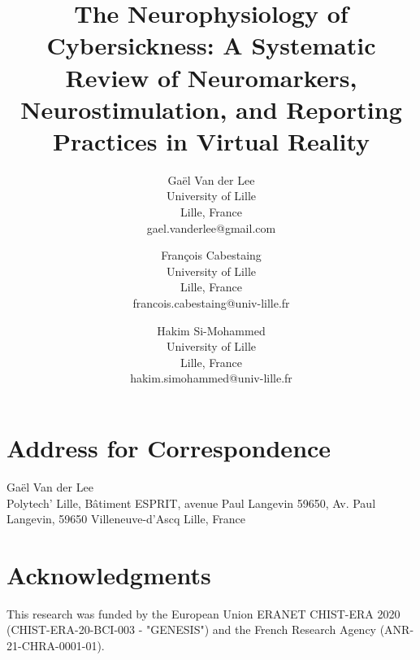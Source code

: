 \documentclass[onecolumn,lettersize]{article}
\begin{document}
\date{}


\title{The Neurophysiology of Cybersickness: A Systematic Review of Neuromarkers, Neurostimulation, and Reporting Practices in Virtual Reality}

\author{
Gaël Van der Lee\\
University of Lille\\
Lille, France\\
gael.vanderlee@gmail.com
\and
François Cabestaing\\
University of Lille\\
Lille, France\\
francois.cabestaing@univ-lille.fr
\and
Hakim Si-Mohammed\\
University of Lille\\
Lille, France\\
hakim.simohammed@univ-lille.fr
}

\maketitle

\section*{Address for Correspondence}
Gaël Van der Lee\\
Polytech' Lille, Bâtiment ESPRIT, avenue Paul Langevin
59650, Av. Paul Langevin, 59650 Villeneuve-d'Ascq
Lille, France

\section*{Acknowledgments}
This research was funded by the European Union ERANET CHIST-ERA 2020 (CHIST-ERA-20-BCI-003 - "GENESIS") and the French Research Agency (ANR-21-CHRA-0001-01).
\end{document}
